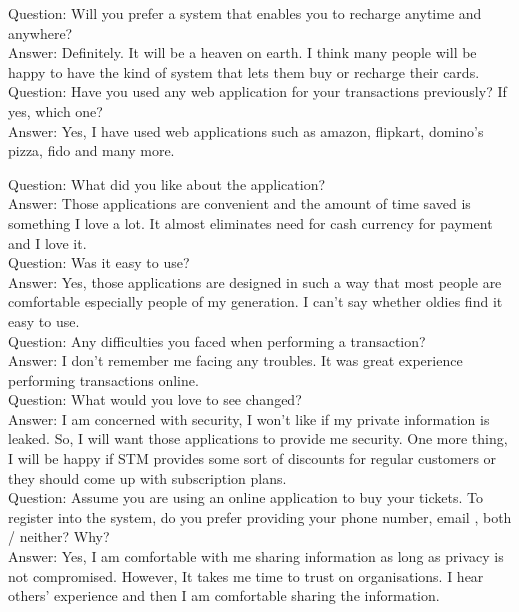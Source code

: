 \documentclass[11pt, english]{report}
\begin{document}
Question: Will you prefer a system that enables you to recharge anytime and anywhere?\\
Answer: Definitely. It will be a heaven on earth. I think many people will be happy to have the kind of system that lets them buy or recharge their cards. \\

Question: Have you used any web application for your transactions previously? If yes, which one? \\
Answer: Yes, I have used web applications such as amazon, flipkart, domino's pizza, fido and many more.

Question: What did you like about the application?\\
Answer: Those applications are convenient and the amount of time saved is something I love a lot. It almost eliminates need for cash currency for payment and I love it.\\

Question: Was it easy to use?\\
Answer: Yes, those applications are designed in such a way that most people are comfortable especially people of my generation. I can't say whether oldies find it easy to use.\\

Question: Any difficulties you faced when performing a transaction?\\
Answer: I don't remember me facing any troubles. It was great experience performing transactions online.\\

Question: What would you love to see changed?\\
Answer: I am concerned with security, I won't like if my private information is leaked. So, I will want those applications to provide me security. One more thing, I will be happy if STM provides some sort of discounts for regular customers or they should come up with subscription plans. \\

Question: Assume you are using an online application to buy your tickets. To register into the system, do you prefer providing your phone number, email , both / neither? Why?\\
Answer: Yes, I am comfortable with me sharing information as long as privacy is not compromised. However, It takes me time to trust on organisations. I hear others' experience and then I am comfortable sharing the information.\\
 
\end{document}
